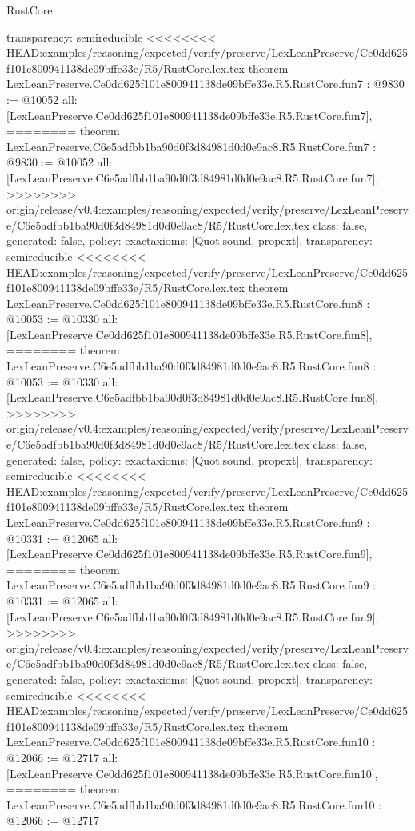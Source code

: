 \begin{lexlean}{RustCore}
\begin{coremodule}
{\begin{coremodule}
{{{{{{{{{{  transparency: semireducible
}
<<<<<<<< HEAD:examples/reasoning/expected/verify/preserve/LexLeanPreserve/Ce0dd625f101e800941138de09bffe33e/R5/RustCore.lex.tex
theorem LexLeanPreserve.Ce0dd625f101e800941138de09bffe33e.R5.RustCore.fun7 : @9830 := @10052 {
  all: [LexLeanPreserve.Ce0dd625f101e800941138de09bffe33e.R5.RustCore.fun7],
========
theorem LexLeanPreserve.C6e5adfbb1ba90d0f3d84981d0d0e9ac8.R5.RustCore.fun7 : @9830 := @10052 {
  all: [LexLeanPreserve.C6e5adfbb1ba90d0f3d84981d0d0e9ac8.R5.RustCore.fun7],
>>>>>>>> origin/release/v0.4:examples/reasoning/expected/verify/preserve/LexLeanPreserve/C6e5adfbb1ba90d0f3d84981d0d0e9ac8/R5/RustCore.lex.tex
  class: false,
  generated: false,
  policy: exact{axioms: [Quot.sound, propext]},
  transparency: semireducible
}
<<<<<<<< HEAD:examples/reasoning/expected/verify/preserve/LexLeanPreserve/Ce0dd625f101e800941138de09bffe33e/R5/RustCore.lex.tex
theorem LexLeanPreserve.Ce0dd625f101e800941138de09bffe33e.R5.RustCore.fun8 : @10053 := @10330 {
  all: [LexLeanPreserve.Ce0dd625f101e800941138de09bffe33e.R5.RustCore.fun8],
========
theorem LexLeanPreserve.C6e5adfbb1ba90d0f3d84981d0d0e9ac8.R5.RustCore.fun8 : @10053 := @10330 {
  all: [LexLeanPreserve.C6e5adfbb1ba90d0f3d84981d0d0e9ac8.R5.RustCore.fun8],
>>>>>>>> origin/release/v0.4:examples/reasoning/expected/verify/preserve/LexLeanPreserve/C6e5adfbb1ba90d0f3d84981d0d0e9ac8/R5/RustCore.lex.tex
  class: false,
  generated: false,
  policy: exact{axioms: [Quot.sound, propext]},
  transparency: semireducible
}
<<<<<<<< HEAD:examples/reasoning/expected/verify/preserve/LexLeanPreserve/Ce0dd625f101e800941138de09bffe33e/R5/RustCore.lex.tex
theorem LexLeanPreserve.Ce0dd625f101e800941138de09bffe33e.R5.RustCore.fun9 : @10331 := @12065 {
  all: [LexLeanPreserve.Ce0dd625f101e800941138de09bffe33e.R5.RustCore.fun9],
========
theorem LexLeanPreserve.C6e5adfbb1ba90d0f3d84981d0d0e9ac8.R5.RustCore.fun9 : @10331 := @12065 {
  all: [LexLeanPreserve.C6e5adfbb1ba90d0f3d84981d0d0e9ac8.R5.RustCore.fun9],
>>>>>>>> origin/release/v0.4:examples/reasoning/expected/verify/preserve/LexLeanPreserve/C6e5adfbb1ba90d0f3d84981d0d0e9ac8/R5/RustCore.lex.tex
  class: false,
  generated: false,
  policy: exact{axioms: [Quot.sound, propext]},
  transparency: semireducible
}
<<<<<<<< HEAD:examples/reasoning/expected/verify/preserve/LexLeanPreserve/Ce0dd625f101e800941138de09bffe33e/R5/RustCore.lex.tex
theorem LexLeanPreserve.Ce0dd625f101e800941138de09bffe33e.R5.RustCore.fun10 : @12066 := @12717 {
  all: [LexLeanPreserve.Ce0dd625f101e800941138de09bffe33e.R5.RustCore.fun10],
========
theorem LexLeanPreserve.C6e5adfbb1ba90d0f3d84981d0d0e9ac8.R5.RustCore.fun10 : @12066 := @12717 {
}}}}}}}}}}}}}}
\end{coremodule}}
\end{coremodule}
\end{lexlean}

